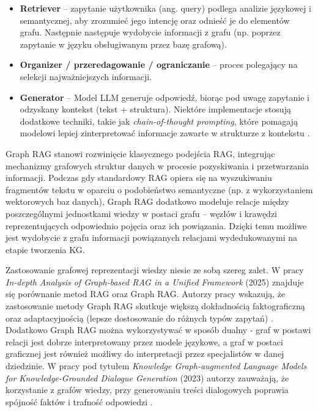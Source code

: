 \documentclass[
a4paper,
12pt,
]{article}
\newcounter{subsubsubsection}[subsubsection]
\begin{document}
\begin{itemize}
    \item \textbf{Retriever} -- zapytanie użytkownika (ang. query) podlega analizie językowej i semantycznej, aby zrozumieć jego intencję oraz odnieść je do elementów grafu. 
    Następnie następuje wydobycie informacji z grafu (np. poprzez zapytanie w języku obsługiwanym przez bazę grafową).
    \item \textbf{Organizer / przeredagowanie / ograniczanie} -- proces polegający na selekcji najważniejszych informacji. 
    \item \textbf{Generator} -- Model LLM generuje odpowiedź, biorąc pod uwagę zapytanie i odzyskany kontekst (tekst + struktura). Niektóre implementacje stosują dodatkowe techniki, takie jak \textit{chain-of-thought prompting}, które pomagają modelowi lepiej zinterpretować informacje zawarte w strukturze z kontekstu \cite{grag1}.
\end{itemize}


Graph RAG stanowi rozwinięcie klasycznego podejścia RAG, integrując mechanizmy grafowych struktur danych w procesie pozyskiwania i przetwarzania informacji. Podczas gdy standardowy RAG opiera się na wyszukiwaniu fragmentów tekstu w oparciu o podobieństwo semantyczne (np. z wykorzystaniem wektorowych baz danych), Graph RAG dodatkowo modeluje relacje między poszczególnymi jednostkami wiedzy w postaci grafu -- węzłów i krawędzi reprezentujących odpowiednio pojęcia oraz ich powiązania. Dzięki temu możliwe jest wydobycie z grafu informacji powiązanych relacjami wydedukowanymi na etapie tworzenia KG.

Zastosowanie grafowej reprezentacji wiedzy niesie ze sobą szereg zalet. W pracy \textit{In-depth Analysis of Graph-based RAG in a Unified Framework} (2025) znajduje się porównanie metod RAG oraz Graph RAG. Autorzy pracy wskazują, że zastosowanie metody Graph RAG skutkuje większą dokładnością faktograficzną oraz adaptacyjnością (lepsze dostosowanie do różnych typów zapytań) \cite{grag2}. Dodatkowo Graph RAG można wykorzystywać w sposób dualny - graf w postawi relacji jest dobrze interpretowany przez modele językowe, a graf w postaci graficznej jest również możliwy do interpretacji przez specjalistów w danej dziedzinie. W pracy pod tytułem \textit{Knowledge Graph-augmented Language Models for Knowledge-Grounded Dialogue Generation} (2023) autorzy zauważają, że korzystanie z grafów wiedzy, przy generowaniu treści dialogowych poprawia spójność faktów i trafność odpowiedzi \cite{grag3}. 
\end{document}
